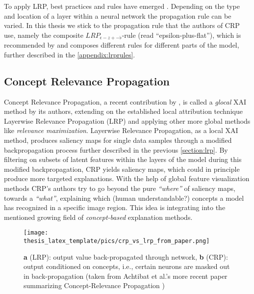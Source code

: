 To apply LRP, best practices and rules have emerged \cite{Kohlbrenner2020, Montavon2019, Samek2021}. Depending on the type and location of a layer within a neural network the propagation rule can be varied. In this thesis we stick to the propagation rule that the authors of CRP use, namely the composite $LRP_{\epsilon-z+-\flat}$-rule (read ``epsilon-plus-flat''), which is recommended by \cite{Kohlbrenner2020} and composes different rules for different parts of the model, further described in the \cref{appendix:lrprules}.

\subsection{Concept Relevance Propagation}\label{section:crp_background}
Concept Relevance Propagation, a recent contribution by \cite{Achtibat2022}, is called a \textit{glocal} XAI method by its authors, extending on the established local attribution technique Layerwise Relevance Propagation (LRP) \cite{Bach2015} and applying other more global methods like \textit{relevance maximization}. 
Layerwise Relevance Propagation, as a local XAI method, produces saliency maps for single data samples through a modified backpropagation process further described in the previous \cref{section:lrp}. By filtering on subsets of latent features within the layers of the model during this modified backpropagation, CRP yields saliency maps, which could in principle produce more targeted explanations. With the help of global feature visualization methods CRP's authors try to go beyond the pure \textit{``where''} of saliency maps, towards a \textit{``what''}, explaining which (human understandable?) concepts a model has recognized in a specific image region. This idea is integrating into the mentioned growing field of \textit{concept-based} explanation methods.

\begin{figure}[t!]
    \centering
    \texttt{[image: thesis\_latex\_template/pics/crp\_vs\_lrp\_from\_paper.png]}
    \caption[CRP vs. LRP]{\textbf{a} (LRP): output value back-propagated through network, \textbf{b} (CRP): output conditioned on concepts, i.e., certain neurons are masked out in back-propagation (taken from Achtibat et al.'s more recent paper summarizing Concept-Relevance Propagation \cite{Achtibat2023})}
    \label{fig:crp_vs_lrp}
\end{figure}

